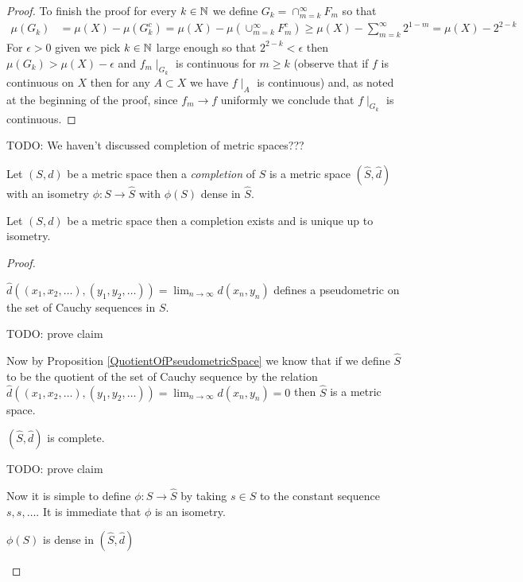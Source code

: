 \begin{proof}
To finish the proof for every $k \in \mathbb{N}$ we define $G_k = \cap_{m=k}^\infty F_m$ so that 
\begin{align*}
\mu(G_k) &= \mu(X) - \mu(G_k^c) = \mu(X) - \mu\left( \cup_{m=k}^\infty F^c_m \right) \geq \mu(X) - \sum_{m=k}^\infty 2^{1-m} = \mu(X) - 2^{2 - k}
\end{align*}
For $\epsilon > 0$ given we pick $k \in \mathbb{N}$ large enough so that $2^{2-k} < \epsilon$ then $\mu(G_k) > \mu(X) - \epsilon$ and $f_m\mid_{G_k}$ is continuous for $m \geq k$  (observe that if $f$ is continuous on $X$ then for any $A \subset X$ we have $f\mid_A$ is continuous) and, as noted at the beginning of the proof, since $f_m \to f$ uniformly we conclude that $f \mid_{G_k}$ is continuous. 
\end{proof}

TODO: We haven't discussed completion of metric spaces???

\begin{defn}Let $(S,d)$ be a metric space then a \emph{completion} of $S$ is a metric space $(\hat{S}, \hat{d})$ with an isometry $\phi : S \to \hat{S}$ with $\phi(S)$ dense in $\hat{S}$.
\end{defn}

\begin{thm}\label{CompletionOfMetricSpace}Let $(S,d)$ be a metric space then a completion exists and is unique up to isometry.
\end{thm}
\begin{proof}

\begin{clm} $\hat{d}((x_1, x_2, \dotsc), (y_1, y_2, \dotsc)) = \lim_{n \to \infty} d(x_n, y_n)$ defines a pseudometric on the set of Cauchy sequences in $S$.
\end{clm}
TODO: prove claim

Now by Proposition \ref{QuotientOfPseudometricSpace} we know that if we define $\hat{S}$ to be the quotient of the set of Cauchy sequence by the relation $\hat{d}((x_1, x_2, \dotsc), (y_1, y_2, \dotsc)) = \lim_{n \to \infty} d(x_n,y_n) = 0$ then $\hat{S}$ is a metric space.

\begin{clm}$(\hat{S}, \hat{d})$ is complete.
\end{clm}
TODO: prove claim

Now it is simple to define $\phi : S \to \hat{S}$ by taking $s \in S$ to the constant sequence $s,s, \dotsc$.  It is immediate that $\phi$ is an isometry.
\begin{clm} $\phi(S)$ is dense in $(\hat{S}, \hat{d})$
\end{clm}
\end{proof}

